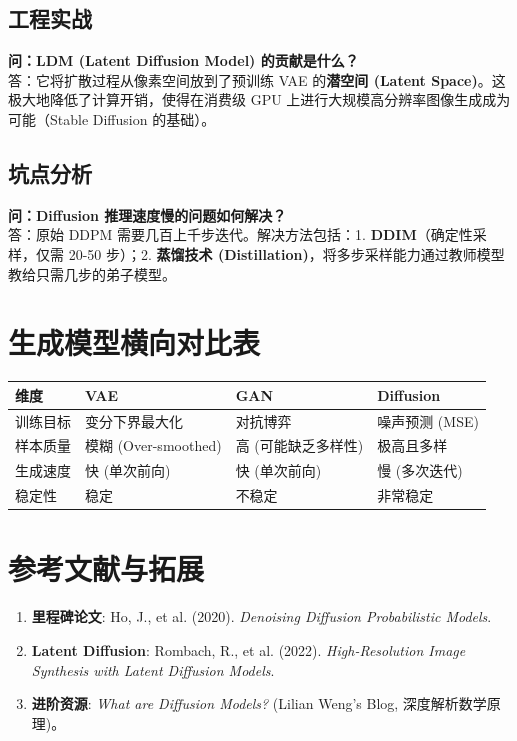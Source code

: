 \documentclass[12pt, a4paper]{book}
\begin{document}
\subsection{工程实战}
\textbf{问：LDM (Latent Diffusion Model) 的贡献是什么？}\\
答：它将扩散过程从像素空间放到了预训练 VAE 的\textbf{潜空间 (Latent Space)}。这极大地降低了计算开销，使得在消费级 GPU 上进行大规模高分辨率图像生成成为可能（Stable Diffusion 的基础）。

\subsection{坑点分析}
\textbf{问：Diffusion 推理速度慢的问题如何解决？}\\
答：原始 DDPM 需要几百上千步迭代。解决方法包括：1. \textbf{DDIM}（确定性采样，仅需 20-50 步）；2. \textbf{蒸馏技术 (Distillation)}，将多步采样能力通过教师模型教给只需几步的弟子模型。

\section{生成模型横向对比表}

\begin{table}[h]
\centering
\begin{tabularx}{\textwidth}{|l|X|X|X|}
\hline
\textbf{维度} & \textbf{VAE} & \textbf{GAN} & \textbf{Diffusion} \\
\hline
训练目标 & 变分下界最大化 & 对抗博弈 & 噪声预测 (MSE) \\
\hline
样本质量 & 模糊 (Over-smoothed) & 高 (可能缺乏多样性) & 极高且多样 \\
\hline
生成速度 & 快 (单次前向) & 快 (单次前向) & 慢 (多次迭代) \\
\hline
稳定性 & 稳定 & 不稳定 & 非常稳定 \\
\hline
\end{tabularx}
\end{table}

\section{参考文献与拓展}
\begin{enumerate}
    \item \textbf{里程碑论文}: Ho, J., et al. (2020). \textit{Denoising Diffusion Probabilistic Models}.
    \item \textbf{Latent Diffusion}: Rombach, R., et al. (2022). \textit{High-Resolution Image Synthesis with Latent Diffusion Models}.
    \item \textbf{进阶资源}: \textit{What are Diffusion Models?} (Lilian Weng's Blog, 深度解析数学原理)。
\end{enumerate}
\end{document}

